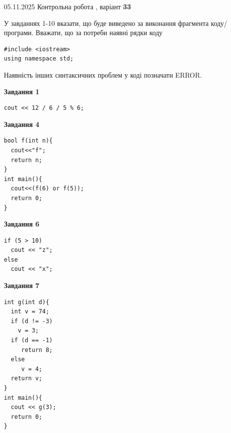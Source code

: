\documentclass[12pt, ukrainian]{article}
\begin{document}
{\Large{05.11.2025 Контрольна робота , варіант  \No \textbf { 33 }\par}}
{
\begin {large}
У завданнях 1-10 вказати, що буде виведено за виконання фрагмента коду/про\-гра\-ми.
Вважати, що за потреби наявні рядки коду
\begin{verbatim}
#include <iostream>
using namespace std;
\end{verbatim}
Наявність інших синтаксичних проблем у коді позначати ERROR.

\begin{minipage}[t]{7.0cm}

\begin{center}
\textbf{Завдання 1}
\end{center}
\vspace{-8mm}

\begin{verbatim}
cout << 12 / 6 / 5 % 6;
\end{verbatim}



\begin{center}
\textbf{Завдання 4}
\end{center}
\vspace{-8mm}

\begin{verbatim}
bool f(int n){
  cout<<"f";
  return n;
}
int main(){
  cout<<(f(6) or f(5));
  return 0;
}
\end{verbatim}



\begin{center}
\textbf{Завдання 6}
\end{center}
\vspace{-8mm}

\begin{verbatim}
if (5 > 10)
  cout << "z";
else
  cout << "x";
\end{verbatim}



\begin{center}
\textbf{Завдання 7}
\end{center}
\vspace{-8mm}

\begin{verbatim}
int g(int d){
  int v = 74;
  if (d != -3)
    v = 3;
  if (d == -1)
     return 8;
  else
     v = 4;
  return v;
}
int main(){
  cout << g(3);
  return 0;
}
\end{verbatim}


\end{minipage}
\end{large}}
\end{document}
